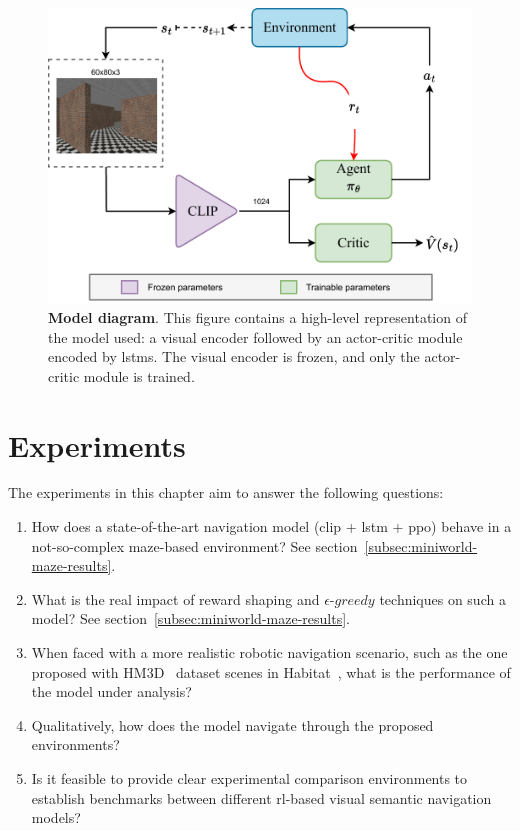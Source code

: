 \begin{figure}
    \centering
    \includegraphics[width=\linewidth]{figures/understanding_vsn/network_clip_diagram}
    \caption[CLIP model diagram]{\textbf{Model diagram}. This figure contains a high-level representation of the model used: a visual encoder followed by an actor-critic module encoded by \acrshort{lstm}s. The visual encoder is frozen, and only the actor-critic module is trained.}
    \label{fig:network_clip_diagram}
\end{figure}


\section{Experiments}
\label{sec:experiments-vsn-understanding}

The experiments in this chapter aim to answer the following questions:
\begin{enumerate}
    \item How does a state-of-the-art navigation model (\acrshort{clip} + \acrshort{lstm} + \acrshort{ppo}) behave in a not-so-complex maze-based environment?
    See section~\ref{subsec:miniworld-maze-results}.
    \item What is the real impact of reward shaping and $\epsilon\text{-}greedy$ techniques on such a model?
    See section~\ref{subsec:miniworld-maze-results}.
    \item When faced with a more realistic robotic navigation scenario, such as the one proposed with HM3D~\cite{ramakrishnan2021} dataset scenes in Habitat~\cite{szot2021}, what is the performance of the model under analysis?
    \item Qualitatively, how does the model navigate through the proposed environments?
    \item Is it feasible to provide clear experimental comparison environments to establish benchmarks between different \acrshort{rl}-based visual semantic navigation models?
\end{enumerate}

